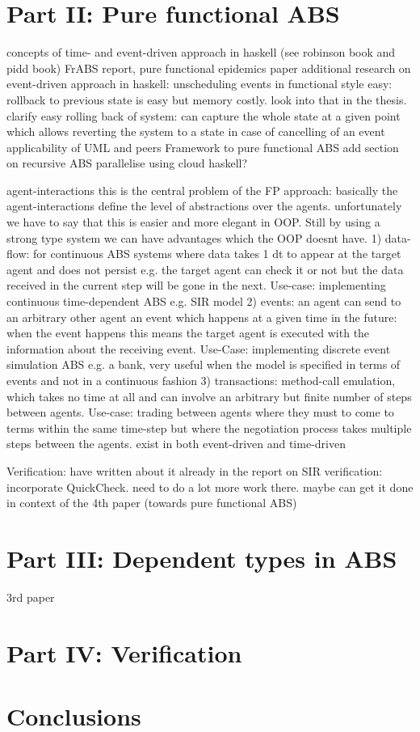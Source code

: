 \documentclass[oneside]{book}
\begin{document}
\chapter{Part II: Pure functional ABS}
concepts of time- and event-driven approach in haskell (see robinson book and pidd book)
FrABS report,
pure functional epidemics paper
additional research on event-driven approach in haskell: unscheduling events in functional style easy: rollback to previous state is easy but memory costly. look into that in the thesis. clarify easy rolling back of system: can capture the whole state at a given point which allows reverting the system to a state in case of cancelling of an event
applicability of UML and peers Framework to pure functional ABS 
add section on recursive ABS
parallelise using cloud haskell?

agent-interactions
this is the central problem of the FP approach: basically the agent-interactions define the level of abstractions over the agents. unfortunately we have to say that this is easier and more elegant in OOP. Still by using a strong type system we can have advantages which the OOP doesnt have.
1) data-flow: for continuous ABS systems where data takes 1 dt to appear at the target agent and does not persist e.g. the target agent can check it or not but the data received in the current step will be gone in the next. Use-case: implementing continuous time-dependent ABS e.g. SIR model
2) events: an agent can send to an arbitrary other agent an event which happens at a given time in the future: when the event happens this means the target agent is executed with the information about the receiving event. Use-Case: implementing discrete event simulation ABS e.g. a bank, very useful when the model is specified in terms of events and not in a continuous fashion
3) transactions: method-call emulation, which takes no time at all and can involve an arbitrary but finite number of steps between agents. Use-case: trading between agents where they must to come to terms within the same time-step but where the negotiation process takes multiple steps between the agents. exist in both event-driven and time-driven

Verification:
have written about it already in the report on SIR verification: incorporate QuickCheck. need to do a lot more work there. maybe can get it done in context of the 4th paper (towards pure functional ABS)

\chapter{Part III: Dependent types in ABS}
3rd paper

\chapter{Part IV: Verification}

\chapter{Conclusions}



\end{document}
